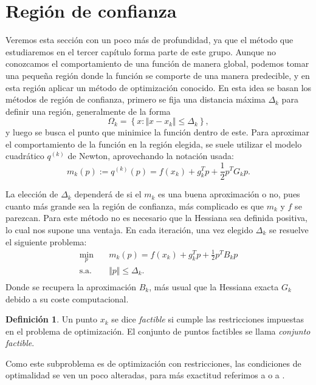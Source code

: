 \documentclass[11pt,a4paper]{book}
\theoremstyle{definition}
\newtheorem{definition}[theorem]{Definición}
\theoremstyle{remark}
\begin{document}
\section{Región de confianza}\label{sec:tr}

Veremos esta sección con un poco más de profundidad, ya que el método que estudiaremos
en el tercer capítulo forma parte de este grupo. Aunque no conozcamos el comportamiento
de una función de manera global, podemos tomar una pequeña región donde la función se
comporte de una manera predecible, y en esta región aplicar un método de optimización
conocido. En esta idea se basan los métodos de región de confianza, primero se fija una distancia máxima $\Delta_k$ para definir una región,
generalmente de la forma
\begin{equation}
	\Omega_k = \left\{x : \Vert x-x_k \Vert \leq \Delta_k \right\},
\end{equation}
y luego se busca el punto que minimice la función dentro de este.
Para aproximar el comportamiento de la función en la región elegida, 
se suele utilizar el modelo cuadrático $q^{(k)}$ de Newton, aprovechando la notación usada:
\begin{equation}
	m_k(p) := q^{(k)}(p) = f(x_k) + g^T_kp + \frac{1}{2}p^TG_kp.
\end{equation}

La elección de $\Delta_k$ dependerá de si el $m_k$ es una buena aproximación o no, pues cuanto más grande sea la región de confianza, más complicado es que $m_k$ y $f$ se parezcan.
Para este método no es necesario que la Hessiana sea definida positiva,
lo cual nos supone una ventaja.
En cada iteración, una vez elegido $\Delta_k$ se resuelve el siguiente problema:
\begin{equation}
\label{min:tr}
\begin{aligned}
	\min_{p} \quad & m_k(p) = f(x_k) + g^T_kp + \frac{1}{2}p^TB_kp \\
	\text{s.a.} \quad & \Vert p \Vert \leq \Delta_k. \\
\end{aligned}
\end{equation}
Donde se recupera la aproximación $B_k$, más usual que la Hessiana exacta $G_k$ debido a
su coste computacional.
\begin{definition}
	Un punto $x_k$ se dice \textit{factible} si cumple las restricciones impuestas en el
	problema de optimización. El conjunto de puntos factibles se llama \textit{conjunto factible}.
\end{definition}
Como este subproblema es de optimización con restricciones, las condiciones de optimalidad
se ven un poco alteradas, para más exactitud referimos a \cite[Capítulo 12]{Nocedal2006-kh} o a
\cite[Capítulo 8]{Sun2006-au}.
\end{document}
